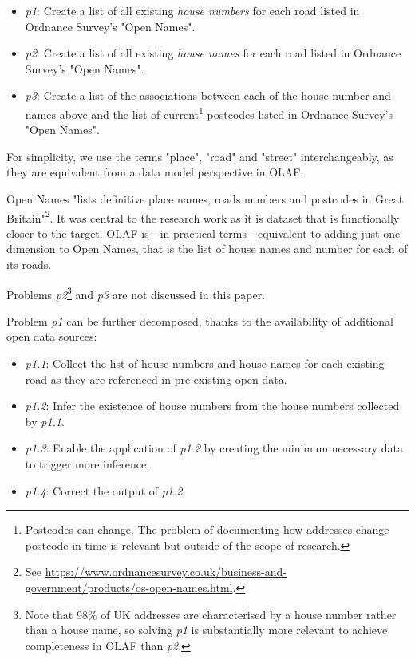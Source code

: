     \begin{itemize}
        \item {\it p1}: Create a list of all existing {\it house numbers} for each road listed in Ordnance Survey's "Open Names".
        \item {\it p2}: Create a list of all existing {\it house names} for each road listed in Ordnance Survey's "Open Names".
        \item {\it p3}: Create a list of the associations between each of the house number and names above and the list of current\footnote{Postcodes can change. The problem of documenting how addresses change postcode in time is relevant but outside of the scope of research.} postcodes listed in Ordnance Survey's "Open Names". 
    \end{itemize}

    For simplicity, we use the terms "place", "road" and "street" interchangeably, as they are equivalent from a data model perspective in OLAF.

    Open Names "lists definitive place names, roads numbers and postcodes in Great Britain"\footnote{See \url{https://www.ordnancesurvey.co.uk/business-and-government/products/os-open-names.html}.}. It was central to the research work as it is dataset that is functionally closer to the target. OLAF is - in practical terms - equivalent to adding just one dimension to Open Names, that is the list of house names and number for each of its roads. 
    
    Problems {\it p2}\footnote{Note that 98\% of UK addresses are characterised by a house number rather than a house name, so solving {\it p1} is substantially more relevant to achieve completeness in OLAF than {\it p2}.} and {\it p3} are not discussed in this paper. 
    
    Problem {\it p1} can be further decomposed, thanks to the availability of additional open data sources:
    
    \begin{itemize}
        \item {\it p1.1}: Collect the list of house numbers and house names for each existing road as they are referenced in pre-existing open data.
        \item {\it p1.2}: Infer the existence of house numbers from the house numbers collected by {\it p1.1}.
        \item {\it p1.3}: Enable the application of {\it p1.2} by creating the minimum necessary data to trigger more inference.
        \item {\it p1.4}: Correct the output of {\it p1.2}.
    \end{itemize}

